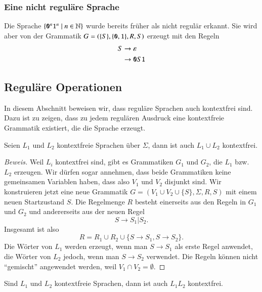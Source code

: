 \subsubsection{Eine nicht reguläre Sprache}
Die Sprache $\{{\tt 0}^n{\tt 1}^n\;|\;n\in\mathbb N\}$ wurde bereits
früher als nicht regulär erkannt. Sie wird aber von der 
Grammatik $G=(\{S\}, \{{\tt 0},{\tt 1}\}, R, S)$ erzeugt
mit den Regeln
\begin{align*}
S&\rightarrow \varepsilon\\
&\rightarrow {\tt 0}S{\tt 1}
\end{align*}

\subsection{Reguläre Operationen\label{sect:cfg-regulaer}}
In diesem Abschnitt beweisen wir, dass reguläre Sprachen auch
kontextfrei sind. Dazu ist zu zeigen, dass
zu jedem regulären Ausdruck eine kontextfreie Grammatik existiert,
die die Sprache erzeugt.

\begin{satz}[Vereinigung]
\label{satz:cfg-union}
%
Seien $L_1$ und $L_2$ kontextfreie Sprachen über $\Sigma$,
dann ist auch $L_1\cup L_2$ kontextfrei.
\end{satz}

\begin{proof}[Beweis]
Weil $L_i$ kontextfrei sind,  gibt es Grammatiken $G_1$ und $G_2$,
die $L_1$ bzw.~$L_2$ erzeugen. Wir dürfen sogar annehmen, dass
beide Grammatiken keine
gemeinsamen Variablen haben, dass also $V_1$ und $V_2$ 
disjunkt sind. Wir konstruieren jetzt eine neue Grammatik
$G=(V_1\cup V_2\cup\{S\}, \Sigma, R, S)$ mit einem neuen
Startzustand $S$. Die Regelmenge $R$ besteht einerseits aus
den Regeln in $G_1$ und $G_2$ und andererseits aus der neuen
Regel
\[
S\to S_1 | S_2.
\]
Insgesamt ist also
\[
R=R_1\cup R_2\cup \{S\to S_1, S\to S_2\}.
\]
Die Wörter von $L_1$ werden erzeugt, wenn man $S\to S_1$ als
erste Regel anwendet, die Wörter von $L_2$ jedoch, wenn 
man $S\to S_2$ verwendet. Die Regeln können nicht ``gemischt''
angewendet werden, weil $V_1\cap V_2=\emptyset$.
\end{proof}

\begin{satz}[Verkettung]
\label{satz:cfg-verkettung}
%
Sind $L_1$ und $L_2$ kontextfreie Sprachen, dann ist auch $L_1L_2$
kontextfrei.
\end{satz}

